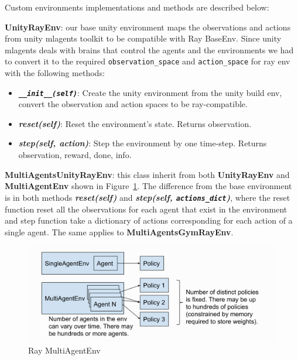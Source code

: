 Custom environments implementations and methods are described below:

\textbf{UnityRayEnv}: our base unity environment maps the observations and actions from unity mlagents toolkit to be compatible with Ray BaseEnv. Since unity mlagents deals with brains that control the agents and the environments we had to convert it to the required \colorbox{gray!20}{\texttt{observation\_space}} and \colorbox{gray!20}{\texttt{action\_space}} for ray env with the following methods:
\begin{itemize}
	\item \textit{\textbf{\colorbox{gray!20}{\texttt{\_\_init\_\_(self)}}}}: Create the unity environment from the unity build env, convert the observation and action spaces to be ray-compatible.
	\item \textit{\textbf{\colorbox{gray!20}{reset(self)}}}: Reset the environment's state. Returns observation.
	\item \textit{\textbf{\colorbox{gray!20}{step(self, action)}}}: Step the environment by one time-step. Returns observation, reward, done, info.
\end{itemize}

\textbf{MultiAgentsUnityRayEnv}: this class inherit from both \colorbox{gray!20}{\textbf{UnityRayEnv}} and \colorbox{gray!20}{\textbf{MultiAgentEnv}} shown in Figure~\ref{fig:ray_multiagentenv}. The difference from the base environment is in both methods \textit{\textbf{\colorbox{gray!20}{reset(self)}}} and \textit{\textbf{\colorbox{gray!20}{step(self, \texttt{actions\_dict})}}}, where the reset function reset all the observations for each agent that exist in the environment and step function take a dictionary of actions corresponding for each action of a single agent. The same applies to \textbf{MultiAgentsGymRayEnv}.

\begin{figure}[!htb]
	\centering
	\includegraphics[width=\linewidth]{figures/architecture/ray_multiagentenv.png}
	\caption{Ray MultiAgentEnv}
	\label{fig:ray_multiagentenv}
\end{figure}

